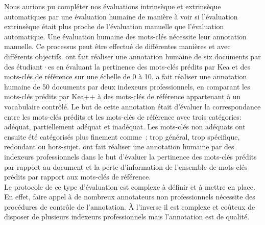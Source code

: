 Nous aurions pu compléter nos évaluations intrinsèque et extrinsèque automatiques par une évaluation humaine de manière à voir si l'évaluation extrinsèque était plus proche de l'évaluation manuelle que l'évaluation automatique.
Une évaluation humaine des mots-clés nécessite leur annotation manuelle. Ce processus peut être effectué de différentes manières et avec différents objectifs.
\citet{jones_human_2001} ont fait réaliser une annotation humaine de six documents par des étudiant·es en évaluant la pertinence des mots-clés prédits par Kea et des mots-clés de référence sur une échelle de 0 à 10.
\citet{balkan_automatic_2017} a fait réaliser une annotation humaine de 50 documents par deux indexeurs professionnels, en comparant les mots-clés prédits par Kea++ à des mots-clés de référence appartenant à un vocabulaire contrôlé.
Le but de cette annotation était d'évaluer la correspondance entre les mots-clés prédits et les mots-clés de référence avec trois catégories: adéquat, partiellement adéquat et inadéquat. Les mots-clés non adéquats ont ensuite été catégorisés plus finement comme~: trop général, trop spécifique, redondant ou hors-sujet.
\citet{bougouin_indexation_2015,barreaux_indexation_2017} ont fait réaliser une annotation humaine par des indexeurs professionnels dans le but d'évaluer la pertinence des mots-clés prédits par rapport au document et la perte d'information de l'ensemble de mots-clés prédits par rapport aux mots-clés de référence.\\
Le protocole de ce type d'évaluation est complexe à définir et à mettre en place. En effet, faire appel à de nombreux annotateurs non professionnels nécessite des procédures de contrôle de l'annotation. \`A l'inverse il est complexe et coûteux de disposer de plusieurs indexeurs professionnels mais l'annotation est de qualité.



